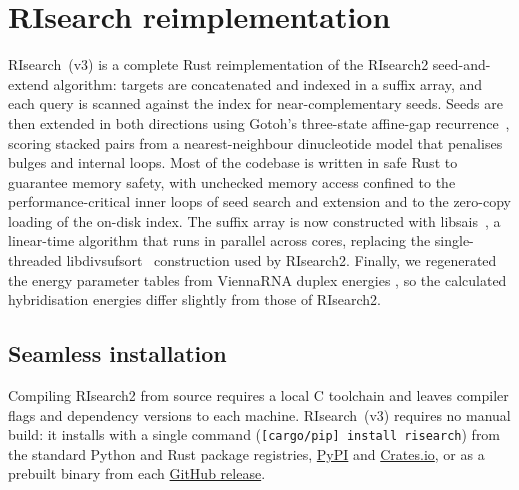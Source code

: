 \documentclass[unnumsec,webpdf,contemporary,large]{oup-authoring-template}
\newcommand{\JG}[1]{{\color{JGCOLOR}#1}}
\begin{document}
\section{RIsearch reimplementation}\label{sec:core}\label{subsec:pybindings}
RIsearch~(v3) is a complete Rust reimplementation of the RIsearch2 seed-and-extend algorithm: targets are concatenated and indexed in a suffix array, and each query is scanned against the index for near-complementary seeds.
Seeds are then extended in both directions using Gotoh's three-state affine-gap recurrence~\citep{gotoh1982improved}, scoring stacked pairs from a nearest-neighbour dinucleotide model that penalises bulges and internal loops.
Most of the codebase is written in safe Rust to guarantee memory safety, with unchecked memory access confined to the performance-critical inner loops of seed search and extension and to the zero-copy loading of the on-disk index.
The suffix array is now constructed with libsais~\citep{libsais}, a linear-time algorithm that runs in parallel across cores, replacing the single-threaded libdivsufsort~\citep{libdivsufsort} construction used by RIsearch2.
Finally, we regenerated the energy parameter tables from ViennaRNA duplex energies \citep{lorenz2011vienna}, so the calculated hybridisation energies differ slightly from those of RIsearch2.

\subsection*{Seamless installation}

Compiling RIsearch2 from source requires a local C toolchain and leaves compiler flags and dependency versions to each machine.
RIsearch~(v3) requires no manual build: it installs with a single command (\texttt{[cargo/pip] install risearch})
from the standard Python and Rust package registries, \href{https://pypi.org/project/risearch/}{PyPI} and \href{https://crates.io/crates/risearch}{Crates.io}, or as a prebuilt binary from each \href{https://github.com/RTH-tools/risearch/releases}{GitHub release}.
\end{document}
